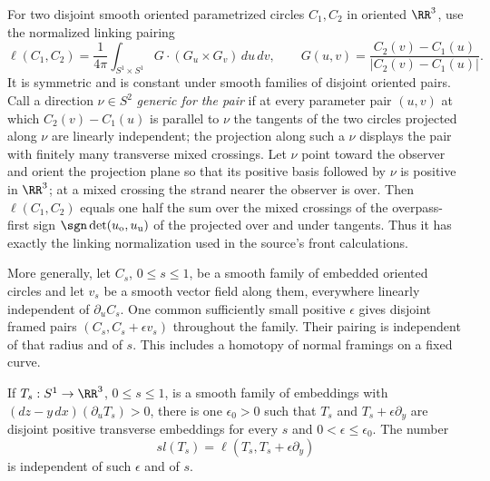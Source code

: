 \begin{lemma}
\label{fd:linking-calculus}\leanok
For two disjoint smooth oriented parametrized circles $C_1,C_2$ in
oriented $\RR^3$, use the normalized linking pairing
\begin{equation}\label{fd:gauss-linking}
 \ell(C_1,C_2)=\frac1{4\pi}\int_{S^1\times S^1}
       G\cdot(G_u\times G_v)\,du\,dv,
 \qquad G(u,v)=\frac{C_2(v)-C_1(u)}{|C_2(v)-C_1(u)|}.
\end{equation}
It is symmetric and is constant under smooth families of disjoint
oriented pairs. Call a direction $\nu\in S^2$ \emph{generic for the pair} if at
every parameter pair $(u,v)$ at which $C_2(v)-C_1(u)$ is parallel to $\nu$
the tangents of the two circles projected along $\nu$ are linearly
independent; the projection along such a $\nu$ displays the pair with
finitely many transverse mixed crossings. Let $\nu$ point toward the
observer and orient the projection plane so that its positive basis followed
by $\nu$ is positive in $\RR^3$; at a mixed crossing the strand nearer the
observer is over. Then $\ell(C_1,C_2)$ equals one half the sum over the
mixed crossings of the overpass-first sign $\sgn\det(u_{\rm o},u_{\rm u})$
of the projected over and under tangents.
Thus it has exactly the linking normalization used in the source's
front calculations.

More generally, let $C_s$, $0\leq s\leq1$, be a smooth family of embedded oriented
circles and let $v_s$ be a smooth vector field along them, everywhere
linearly independent of $\partial_uC_s$. One common sufficiently small
positive $\epsilon$ gives disjoint framed pairs
$(C_s,C_s+\epsilon v_s)$ throughout the family. Their pairing is
independent of that radius and of $s$. This includes a homotopy of
normal framings on a fixed curve.

If $T_s:S^1\to\RR^3$, $0\leq s\leq1$, is a smooth family of
embeddings with $(dz-y\,dx)(\partial_uT_s)>0$, there is one
$\epsilon_0>0$ such that $T_s$ and $T_s+\epsilon\partial_y$ are
disjoint positive transverse embeddings for every $s$ and
$0<\epsilon\leq\epsilon_0$. The number
\begin{equation}\label{fd:framed-linking}
            sl(T_s)=\ell(T_s,T_s+\epsilon\partial_y)
\end{equation}
is independent of such $\epsilon$ and of $s$.

\end{lemma}
